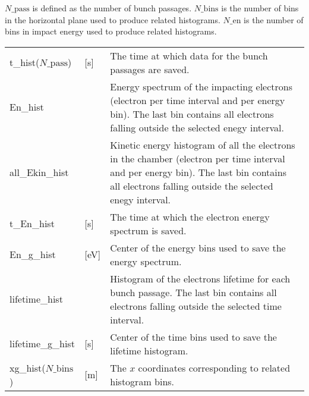 \documentclass[a4paper,12pt]{article}
\begin{document}
$N\_{\mathrm{pass}}$ is defined as the number of bunch passages.
$N\_{\mathrm{bins}}$ is the number of bins in the horizontal plane used to produce related histograms.
$N\_\mathrm{en}$ is the number of bins in impact energy used to produce related histograms.
\begin{longtable}
    {p{}p{}p{}}
    \hline\endfirsthead\hline\endhead
    \rowcolor{Gray}\multicolumn{3}{p{.97\textwidth}}{
    \textbf{Variables saved at each bunch passage}}
    \\\hline
    t\_hist($N\_{\mathrm{pass}}$) & [s] & The time at which data for the bunch passages are saved.\\\hline

    En\_hist &  & Energy spectrum of the impacting electrons (electron per time interval and per energy bin). The last bin contains all electrons falling outside the selected enegy interval. \\\hline
		all\_Ekin\_hist &  & Kinetic energy histogram of all the electrons in the chamber (electron per time interval and per energy bin). The last bin contains all electrons falling outside the selected enegy interval. \\\hline
    t\_En\_hist & [s] & The time at which the electron energy spectrum is saved.\\\hline
    En\_g\_hist &[eV]& Center of the energy bins used to save the energy spectrum.\\\hline

    lifetime\_hist &  & Histogram of the electrons lifetime for each bunch passage. The last bin contains all electrons falling outside the selected time interval. \\\hline
    lifetime\_g\_hist &[s]& Center of the time bins used to save the lifetime histogram.\\\hline

    xg\_hist($N\_{\mathrm{bins}}$) & [m] & The $x$ coordinates corresponding to related histogram bins.\\\hline


\end{longtable}
\end{document}
